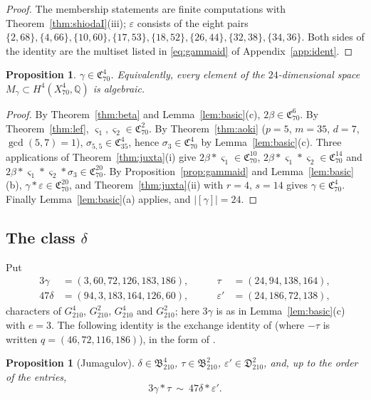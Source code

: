 \documentclass[11pt]{amsart}
\newtheorem{proposition}[theorem]{Proposition}
\theoremstyle{definition}
\theoremstyle{remark}
\numberwithin{equation}{section}
\newcommand{\Q}{\mathbb{Q}}
\newcommand{\fB}{\mathfrak{B}}
\newcommand{\fC}{\mathfrak{C}}
\newcommand{\fD}{\mathfrak{D}}
\begin{document}
\begin{proof}
The membership statements are finite computations with Theorem~\ref{thm:shiodaI}(iii); $\varepsilon$ consists of the eight pairs $\{2,68\},\{4,66\},\{10,60\},\{17,53\},\{18,52\},\{26,44\},\{32,38\},\{34,36\}$. Both sides of the identity are the multiset listed in \eqref{eq:gammaid} of Appendix~\ref{app:ident}.
\end{proof}

\begin{proposition}\label{prop:gamma}
$\gamma\in\fC^4_{70}$. Equivalently, every element of the $24$-dimensional space $M_\gamma\subset H^4(X^4_{70},\Q)$ is algebraic.
\end{proposition}

\begin{proof}
By Theorem~\ref{thm:beta} and Lemma~\ref{lem:basic}(c), $2\beta\in\fC^6_{70}$. By Theorem~\ref{thm:lef}, $\varsigma_1,\varsigma_2\in\fC^2_{70}$. By Theorem~\ref{thm:aoki} ($p=5$, $m=35$, $d=7$, $\gcd(5,7)=1$), $\sigma_{5,5}\in\fC^4_{35}$, hence $\sigma_3\in\fC^4_{70}$ by Lemma~\ref{lem:basic}(c). Three applications of Theorem~\ref{thm:juxta}(i) give $2\beta*\varsigma_1\in\fC^{10}_{70}$, $2\beta*\varsigma_1*\varsigma_2\in\fC^{14}_{70}$ and $2\beta*\varsigma_1*\varsigma_2*\sigma_3\in\fC^{20}_{70}$. By Proposition~\ref{prop:gammaid} and Lemma~\ref{lem:basic}(b), $\gamma*\varepsilon\in\fC^{20}_{70}$, and Theorem~\ref{thm:juxta}(ii) with $r=4$, $s=14$ gives $\gamma\in\fC^4_{70}$. Finally Lemma~\ref{lem:basic}(a) applies, and $|[\gamma]|=24$.
\end{proof}

\subsection{\texorpdfstring{The class $\delta$}{The class delta}}\label{subsec:delta}
Put
\[
\begin{aligned}
3\gamma&=(3,60,72,126,183,186), &\qquad \tau&=(24,94,138,164),\\
47\delta&=(94,3,183,164,126,60), &\qquad \varepsilon'&=(24,186,72,138),
\end{aligned}
\]
characters of $G^4_{210}$, $G^2_{210}$, $G^4_{210}$ and $G^2_{210}$; here $3\gamma$ is as in Lemma~\ref{lem:basic}(c) with $e=3$. The following identity is the exchange identity of \cite[Prop.~4.2]{Jum26b} (where $-\tau$ is written $q=(46,72,116,186)$), in the form of \cite[Thm.~4.1]{Jum26b}.

\begin{proposition}[Jumagulov]\label{prop:deltaid}
$\delta\in\fB^4_{210}$, $\tau\in\fB^2_{210}$, $\varepsilon'\in\fD^2_{210}$, and, up to the order of the entries,
\[
3\gamma*\tau\ \sim\ 47\delta*\varepsilon'.
\]
\end{proposition}
\end{document}
